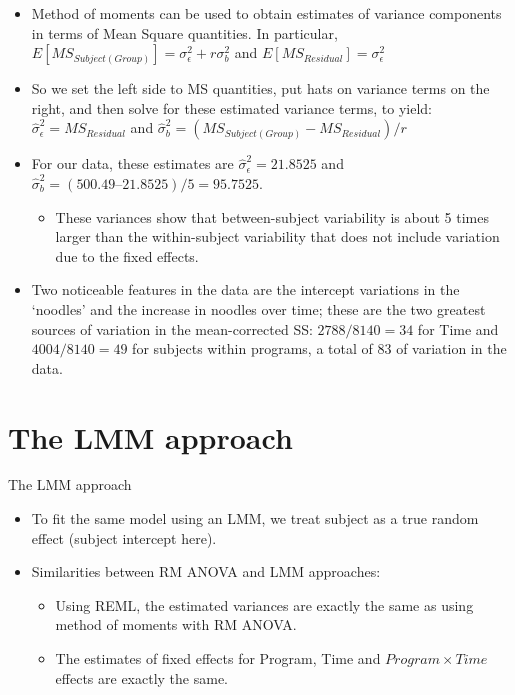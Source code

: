 \documentclass[
  9pt,
  ignorenonframetext,
]{beamer}
\providecommand{\tightlist}{%
  \setlength{\itemsep}{0pt}\setlength{\parskip}{0pt}}
\begin{document}
\begin{frame}{}
\protect\hypertarget{section-5}{}
\begin{itemize}
\item
  Method of moments can be used to obtain estimates of variance
  components in terms of Mean Square quantities. In particular,
  \(E[MS_{Subject(Group)}] = \sigma_\epsilon^2+r\sigma_b^2\) and
  \(E[MS_{Residual}] = \sigma_\epsilon^2\)
\item
  So we set the left side to MS quantities, put hats on variance terms
  on the right, and then solve for these estimated variance terms, to
  yield: \(\hat \sigma_\epsilon^2 = MS_{Residual}\) and
  \(\hat \sigma_b^2 = (MS_{Subject(Group)} - MS_{Residual})/r\)
\item
  For our data, these estimates are \(\hat \sigma_\epsilon^2=21.8525\)
  and \(\hat \sigma_b^2=(500.49 – 21.8525)/5 = 95.7525\).

  \begin{itemize}
  \tightlist
  \item
    These variances show that between-subject variability is about 5
    times larger than the within-subject variability that does not
    include variation due to the fixed effects.
  \end{itemize}
\item
  Two noticeable features in the data are the intercept variations in
  the `noodles' and the increase in noodles over time; these are the two
  greatest sources of variation in the mean-corrected SS:
  \(2788/8140 = 34%
  \) for Time and \(4004/8140 = 49%
  \) for subjects within programs, a total of \(83%
  \) of variation in the data.
\end{itemize}
\end{frame}

\hypertarget{the-lmm-approach}{%
\section{The LMM approach}\label{the-lmm-approach}}

\begin{frame}{The LMM approach}
\protect\hypertarget{the-lmm-approach-1}{}
\begin{itemize}
\item
  To fit the same model using an LMM, we treat subject as a true random
  effect (subject intercept here).
\item
  Similarities between RM ANOVA and LMM approaches:

  \begin{itemize}
  \item
    Using REML, the estimated variances are exactly the same as using
    method of moments with RM ANOVA.
  \item
    The estimates of fixed effects for Program, Time and
    \(Program \times Time\) effects are exactly the same.
  \end{itemize}
\end{itemize}
\end{frame}
\end{document}

